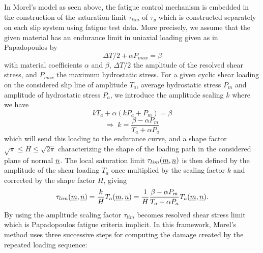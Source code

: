 In Morel's model as seen above, the fatigue control mechanism is embedded in the construction of the saturation limit $\tau_{lim}$ of $\tau_y$ which is constructed separately on each slip system using fatigue test data. More precisely, we assume that the given material has an endurance limit in uniaxial loading given as in Papadopoulos by
$$\Delta T/2+\alpha P_{max}=\beta$$
with material coefficients $\alpha$ and $\beta$, $\Delta T/2$ the amplitude of the resolved shear stress, and $P_{max}$ the maximum hydrostatic stress. For a given cyclic shear loading on the considered slip line of amplitude $T_a$, average hydrostatic stress $P_m$ and amplitude of hydrostatic stress $P_a$, we introduce the amplitude scaling $k$ where we have
$$kT_a+\alpha\left( kP_a+P_m\right)=\beta  $$
 $$\Rightarrow \; k=\dfrac{\beta-\alpha P_m}{T_a+\alpha P_a}$$ 
 which will send this loading to the endurance curve, and a shape factor $\sqrt{\pi}\leqslant H\leqslant \sqrt{2\pi}$ characterizing the shape of the loading path in the considered plane of normal $\uline{n}$. The local saturation limit $\tau_{lim}(\uline{m},\uline{n})$ is then defined by the amplitude of the shear loading $T_a$ once multiplied by the scaling factor $k$ and corrected by the shape factor $H$, giving
$$\tau_{lim}(\uline{m},\uline{n})=\frac{k}{H}T_a(\uline{m},\uline{n})=\frac{1}{H}\frac{\beta-\alpha P_m}{T_a+\alpha P_a}T_a(\uline{m},\uline{n}).$$
By using the amplitude scaling factor $\tau_{lim}$ becomes resolved shear stress limit which is Papadopoulos fatigue criteria implicit. In this framework, Morel's method uses three successive steps for computing the damage created by the repeated loading sequence:


